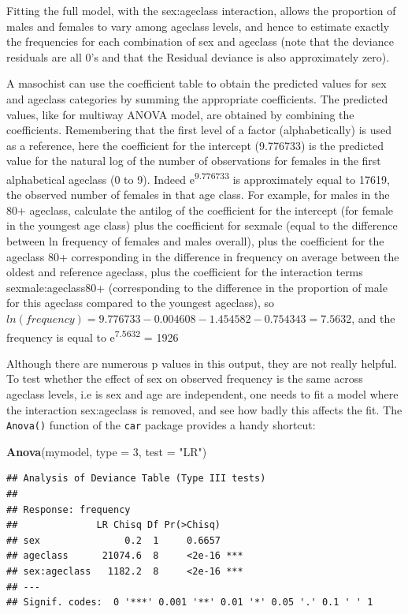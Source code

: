 \documentclass[
  12pt,
]{book}
\newenvironment{Shaded}{\begin{snugshade}}{\end{snugshade}}
\newcommand{\DataTypeTok}[1]{\textcolor[rgb]{0.13,0.29,0.53}{#1}}
\newcommand{\DecValTok}[1]{\textcolor[rgb]{0.00,0.00,0.81}{#1}}
\newcommand{\KeywordTok}[1]{\textcolor[rgb]{0.13,0.29,0.53}{\textbf{#1}}}
\newcommand{\NormalTok}[1]{#1}
\newcommand{\StringTok}[1]{\textcolor[rgb]{0.31,0.60,0.02}{#1}}
\begin{document}
Fitting the full model, with the sex:ageclass interaction, allows the proportion of males and females to vary among ageclass levels, and hence to estimate exactly the frequencies for each combination of sex and ageclass (note that the deviance residuals are all 0's and that the Residual deviance is also approximately zero).

A masochist can use the coefficient table to obtain the predicted values for sex and ageclass categories by summing the appropriate coefficients. The predicted values, like for multiway ANOVA model, are obtained by combining the coefficients. Remembering that the first level of a factor (alphabetically) is used as a reference, here the coefficient for the intercept (9.776733) is the predicted value for the natural log of the number of observations for females in the first alphabetical ageclass (0 to 9). Indeed e\textsuperscript{9.776733} is approximately equal to 17619, the observed number of females in that age class. For example, for males in the 80+ ageclass, calculate the antilog of the coefficient for the intercept (for female in the youngest age class) plus the coefficient for sexmale (equal to the difference between ln frequency of females and males overall), plus the coefficient for the ageclass 80+ corresponding in the difference in frequency on average between the oldest and reference ageclass, plus the coefficient for the interaction terms sexmale:ageclass80+ (corresponding to the difference in the proportion of male for this ageclass compared to the youngest ageclass), so \(ln(frequency)=9.776733-0.004608-1.454582- 0.754343 = 7.5632\), and the frequency is equal to e\textsuperscript{7.5632} = 1926

Although there are numerous p values in this output, they are not really helpful. To test whether the effect of sex on observed frequency is the same across ageclass levels, i.e is sex and age are independent, one needs to fit a model where the interaction sex:ageclass is removed, and see how badly this affects the fit. The \texttt{Anova()} function of the \texttt{car} package provides a handy shortcut:

\begin{Shaded}
\begin{Highlighting}[]
\KeywordTok{Anova}\NormalTok{(mymodel, }\DataTypeTok{type =} \DecValTok{3}\NormalTok{, }\DataTypeTok{test =} \StringTok{"LR"}\NormalTok{)}
\end{Highlighting}
\end{Shaded}

\begin{verbatim}
## Analysis of Deviance Table (Type III tests)
## 
## Response: frequency
##              LR Chisq Df Pr(>Chisq)    
## sex               0.2  1     0.6657    
## ageclass      21074.6  8     <2e-16 ***
## sex:ageclass   1182.2  8     <2e-16 ***
## ---
## Signif. codes:  0 '***' 0.001 '**' 0.01 '*' 0.05 '.' 0.1 ' ' 1
\end{verbatim}
\end{document}

